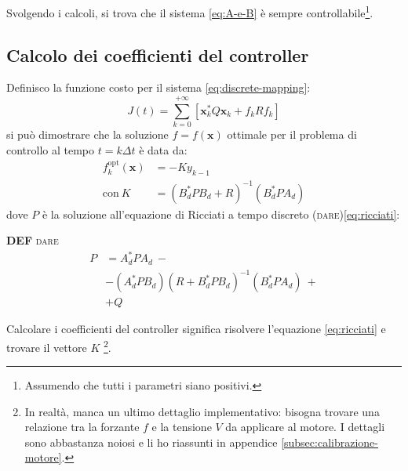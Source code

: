 Svolgendo i calcoli, si trova che il sistema \eqref{eq:A-e-B} è sempre controllabile\footnote{Assumendo che tutti i
parametri siano positivi.}.

\subsection{Calcolo dei coefficienti del controller}\label{calcolo-coefficienti}
Definisco la funzione costo per il sistema \eqref{eq:discrete-mapping}:
\begin{equation}
  J(t) =
  \sum_{k=0}^{+\infty} \left[ \mathbf{x}_k^* Q \mathbf {x}_k + f_k R f_k \right]
  \label{eq:lqr-costo-discreto}
\end{equation}
si può dimostrare\cite{chow1975analysis} che la soluzione $f = f(\mathbf x)$ ottimale per il problema di controllo al tempo $t = k \Delta t$ è data da:
\begin{equation}
  \begin{aligned}
  f_k^{\text{opt}}(\mathbf x) &= -K y_{k-1} \\
  \text{con}\ K &= (B_d^*PB_d + R)^{-1}(B_d^*PA_d)
  \end{aligned}
  \label{eq:f-opt}
\end{equation}
dove $P$ è la soluzione all'equazione di Ricciati a tempo discreto (\textsc{dare})\eqref{eq:ricciati}:%
\begin{framed}
  \textbf{DEF} \textsc{dare}
  \begin{equation}
    \begin{aligned}
    P &=A_d^* P A_d\ - \\
     &-(A_d^* P B_d)(R + B_d^* P B_d)^{-1}(B_d^* P A_d)\ + \\
    &+ Q
    \end{aligned}
    \label{eq:ricciati}
  \end{equation}%
\end{framed}%
Calcolare i coefficienti del controller significa risolvere l'equazione \eqref{eq:ricciati} e trovare il vettore $K$
\footnote{In realtà, manca un ultimo dettaglio implementativo: bisogna trovare una relazione tra la forzante $f$ e
la tensione $V$ da applicare al motore. I dettagli sono abbastanza noiosi e li ho riassunti in appendice \ref{subsec:calibrazione-motore}.}.


